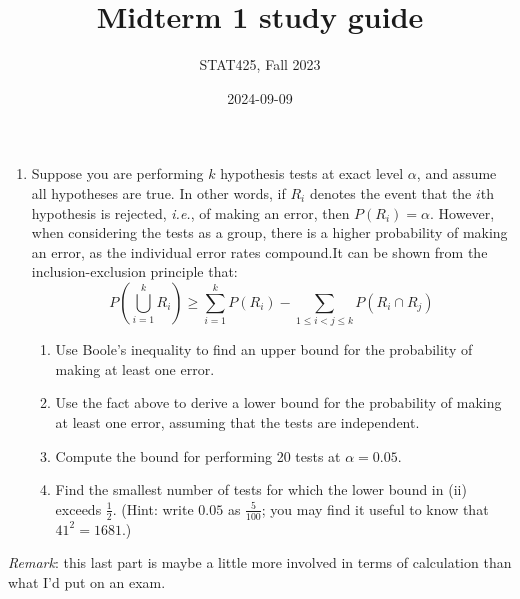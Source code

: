 \documentclass[
  letterpaper,
  DIV=11,
  numbers=noendperiod]{scrartcl}
\title{Midterm 1 study guide}
\author{STAT425, Fall 2023}
\date{2024-09-09}
\providecommand{\tightlist}{%
  \setlength{\itemsep}{0pt}\setlength{\parskip}{0pt}}\usepackage{longtable,booktabs,array}
\begin{document}
\maketitle

\pagestyle{fancy}  

\begin{enumerate}
\def\labelenumi{\arabic{enumi}.}
\tightlist
\item
  Suppose you are performing \(k\) hypothesis tests at exact level
  \(\alpha\), and assume all hypotheses are true. In other words, if
  \(R_i\) denotes the event that the \(i\)th hypothesis is rejected,
  \emph{i.e.}, of making an error, then \(P(R_i) = \alpha\). However,
  when considering the tests as a group, there is a higher probability
  of making an error, as the individual error rates compound.It can be
  shown from the inclusion-exclusion principle that: \[
  P\left(\bigcup_{i = 1}^k R_i\right) \geq \sum_{i = 1}^k P(R_i) - \sum_{1 \leq i < j \leq k} P(R_i \cap R_j)
  \]

  \begin{enumerate}
  \def\labelenumii{\roman{enumii}.}
  \tightlist
  \item
    Use Boole's inequality to find an upper bound for the probability of
    making at least one error.
  \item
    Use the fact above to derive a lower bound for the probability of
    making at least one error, assuming that the tests are independent.
  \item
    Compute the bound for performing 20 tests at \(\alpha = 0.05\).
  \item
    Find the smallest number of tests for which the lower bound in (ii)
    exceeds \(\frac{1}{2}\). (Hint: write \(0.05\) as \(\frac{5}{100}\);
    you may find it useful to know that \(41^2 = 1681\).)
  \end{enumerate}
\end{enumerate}

\emph{Remark}: this last part is maybe a little more involved in terms
of calculation than what I'd put on an exam.
\end{document}
